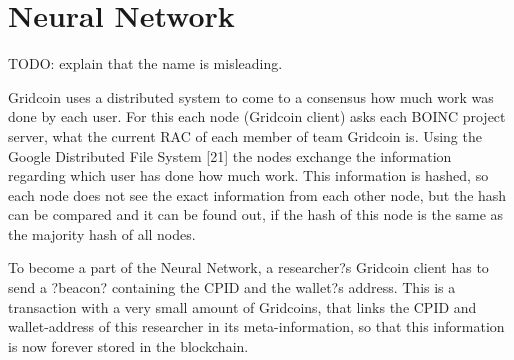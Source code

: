 \section{Neural Network}

TODO: explain that the name is misleading.

Gridcoin uses a distributed system to come to a consensus how much work was done by each user. For this each node (Gridcoin client) asks each BOINC project server, what  the current RAC of each member of team Gridcoin is. Using the Google Distributed File System [21] the nodes exchange the information regarding which user has done how much work. This information is hashed, so each node does not see the exact information from each other node, but the hash can be compared and it can be found out, if the hash of this node is the same as the majority hash of all nodes.

To become a part of the Neural Network, a researcher?s Gridcoin client has to send a ?beacon? containing the CPID and the wallet?s address. This is a transaction with a very small amount of Gridcoins, that links  the CPID  and wallet-address of this researcher in  its meta-information, so that this information is now forever stored in the blockchain.

